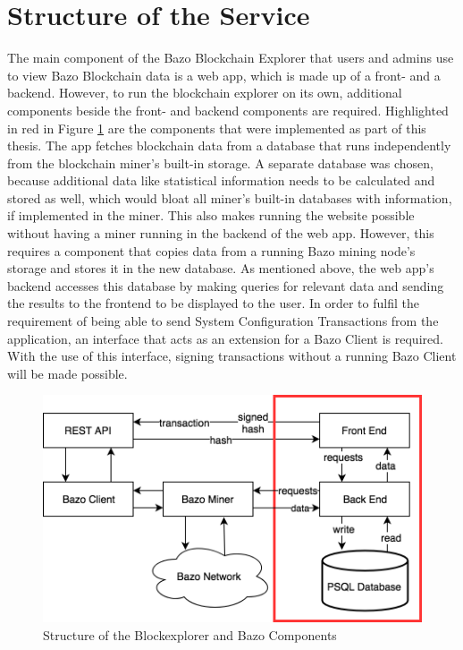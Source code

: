 \section{Structure of the Service}
The main component of the Bazo Blockchain Explorer that users and admins use to view Bazo Blockchain data is a web app, which is made up of a front- and a backend. However, to run the blockchain explorer on its own, additional components beside the front- and backend components are required. Highlighted in red in Figure \ref{fig:structure} are the components that were implemented as part of this thesis. The app fetches blockchain data from a database that runs independently from the blockchain miner's built-in storage. A separate database was chosen, because additional data like statistical information needs to be calculated and stored as well, which would bloat all miner's built-in databases with information, if implemented in the miner. This also makes running the website possible without having a miner running in the backend of the web app. However, this requires a component that copies data from a running Bazo mining node's storage and stores it in the new database. As mentioned above, the web app's backend accesses this database by making queries for relevant data and sending the results to the frontend to be displayed to the user. In order to fulfil the requirement of being able to send System Configuration Transactions from the application, an interface that acts as an extension for a Bazo Client is required. With the use of this interface, signing transactions without a running Bazo Client will be made possible.

\begin{figure}
  \includegraphics[scale=0.4]{system.png}
  \centering
  \caption{Structure of the Blockexplorer and Bazo Components}
  \label{fig:structure}
\end{figure}

